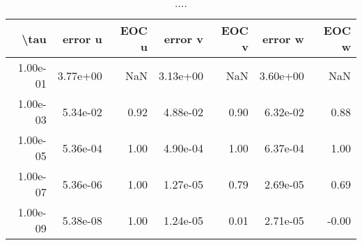 \begin{table}[ht]
\centering
\begin{tabular}{rrrrrrr}
  \hline
  \textbf{\textbackslash{}tau} & \textbf{error u} & \textbf{EOC u} & \textbf{error v} & \textbf{EOC v} & \textbf{error w} & \textbf{EOC w} \\\hline
  1.00e-01 & 3.77e+00 & NaN & 3.13e+00 & NaN & 3.60e+00 & NaN \\
  1.00e-03 & 5.34e-02 & 0.92 & 4.88e-02 & 0.90 & 6.32e-02 & 0.88 \\
  1.00e-05 & 5.36e-04 & 1.00 & 4.90e-04 & 1.00 & 6.37e-04 & 1.00 \\
  1.00e-07 & 5.36e-06 & 1.00 & 1.27e-05 & 0.79 & 2.69e-05 & 0.69 \\
  1.00e-09 & 5.38e-08 & 1.00 & 1.24e-05 & 0.01 & 2.71e-05 & -0.00 \\\hline
\end{tabular}
\caption{....}
\end{table}
